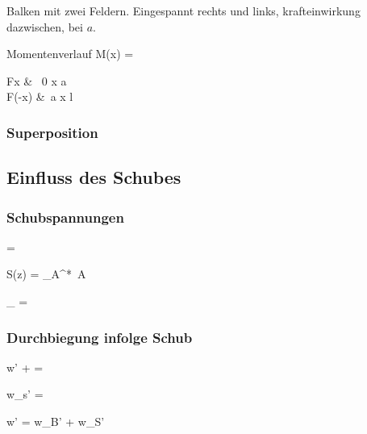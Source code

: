 \documentclass[11pt]{article}
\newcommand{\1}{ {\mathds{1}} }
\newcommand{\td}{\,\text{d}}
\begin{document}
\begin{multicols*}{3}
		Balken mit zwei Feldern. Eingespannt rechts und links, krafteinwirkung dazwischen, bei $a$. 

		\begin{formel}{Momentenverlauf}
			M(x) = 
			\begin{cases}
				Fx & \, 0 \leq x \leq a\\
				F\left(\ell -x\right) &\, a \leq x \leq l
			\end{cases}
		\end{formel}

		\subsubsection{Superposition}
		\subsection{Einfluss des Schubes}
		\subsubsection{Schubspannungen}

		\begin{formel}{4.35}
			 =  \zeta
		\end{formel}

		\begin{formel}{4.36}
			S(z) = \int\limits_{A^*} \zeta \td A
		\end{formel}

		\begin{formel}{4.37}
			_{} = 
		\end{formel}

		\subsubsection{Durchbiegung infolge Schub}

		\begin{formel}{4.40}
			w' + \psi = 
		\end{formel}

		\begin{formel}{4.41}
			w_s' = 
		\end{formel}

		\begin{formel}{4.42}
			w' = w_B' + w_S'
		\end{formel}


\end{multicols*}
\end{document}
